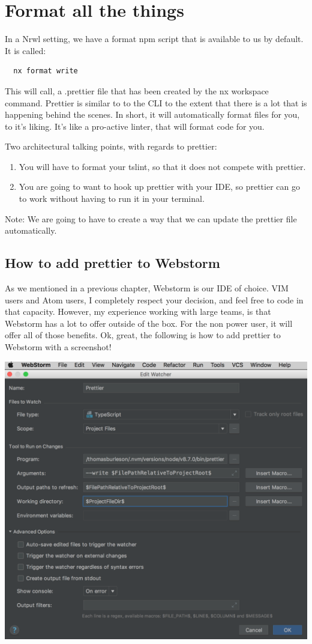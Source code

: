 
\chapter{ Format all the things }

In a Nrwl setting, we have a format npm script that is available to us by default.
It is called:

\begin{verbatim}
  nx format write
\end{verbatim}

This will call, a .prettier file that has been created by the nx workspace
command. Prettier is similar to to the CLI to the extent that there is a lot
that is happening behind the scenes. In short, it will automatically format files
for you, to it's liking. It's like a pro-active linter, that will format code
for you.

Two architectural talking points, with regards to prettier:
\begin{enumerate}
  \item You will have to format your tslint, so that it does not compete with prettier.
  \item You are going to want to hook up prettier with your IDE, so prettier
  can go to work without having to run it in your terminal.
\end{enumerate}

Note: We are going to have to create a way that we can update the prettier file
automatically.

\section{ How to add prettier to Webstorm }
As we mentioned in a previous chapter, Webstorm is our IDE of choice. VIM users
and Atom users, I completely respect your decision, and feel free to code in
that capacity. However, my experience working with large teams, is  that Webstorm
has a lot to offer outside of the box. For the non power user, it will offer
all of those benefits. Ok, great, the following is how to add prettier to Webstorm
with a screenshot!

\includegraphics[scale=0.5]{dev-tools/linting/format-all-the-things/prettier-file-watcher-webstorm}
